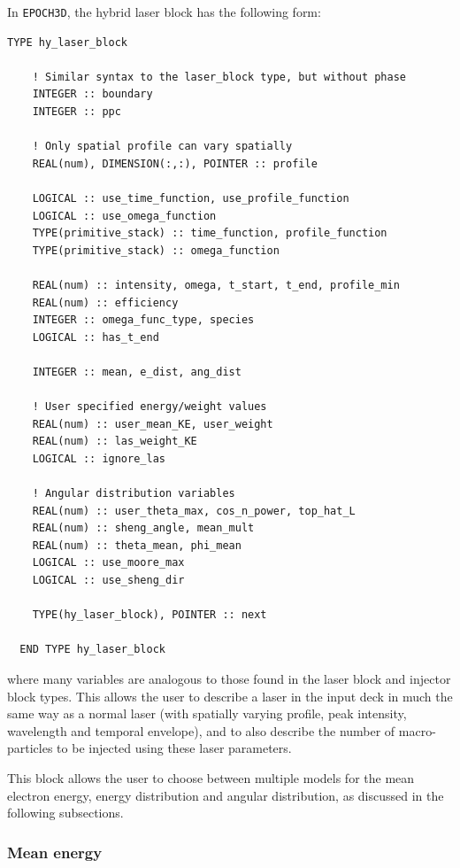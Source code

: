\documentclass[12pt]{article}
\numberwithin{equation}{section}
\begin{document}
In \texttt{EPOCH3D}, the hybrid laser block has the following form:

\begin{lstlisting}[style=myInputDeck]
  TYPE hy_laser_block

    ! Similar syntax to the laser_block type, but without phase
    INTEGER :: boundary
    INTEGER :: ppc

    ! Only spatial profile can vary spatially
    REAL(num), DIMENSION(:,:), POINTER :: profile

    LOGICAL :: use_time_function, use_profile_function
    LOGICAL :: use_omega_function
    TYPE(primitive_stack) :: time_function, profile_function
    TYPE(primitive_stack) :: omega_function

    REAL(num) :: intensity, omega, t_start, t_end, profile_min 
    REAL(num) :: efficiency
    INTEGER :: omega_func_type, species
    LOGICAL :: has_t_end

    INTEGER :: mean, e_dist, ang_dist

    ! User specified energy/weight values
    REAL(num) :: user_mean_KE, user_weight
    REAL(num) :: las_weight_KE
    LOGICAL :: ignore_las

    ! Angular distribution variables
    REAL(num) :: user_theta_max, cos_n_power, top_hat_L
    REAL(num) :: sheng_angle, mean_mult
    REAL(num) :: theta_mean, phi_mean
    LOGICAL :: use_moore_max
    LOGICAL :: use_sheng_dir

    TYPE(hy_laser_block), POINTER :: next

  END TYPE hy_laser_block
\end{lstlisting}

where many variables are analogous to those found in the laser block and injector block types. This allows the user to describe a laser in the input deck in much the same way as a normal laser (with spatially varying profile, peak intensity, wavelength and temporal envelope), and to also describe the number of macro-particles to be injected using these laser parameters.

This block allows the user to choose between multiple models for the mean electron energy, energy distribution and angular distribution, as discussed in the following subsections.

\subsubsection{Mean energy}
\end{document}
